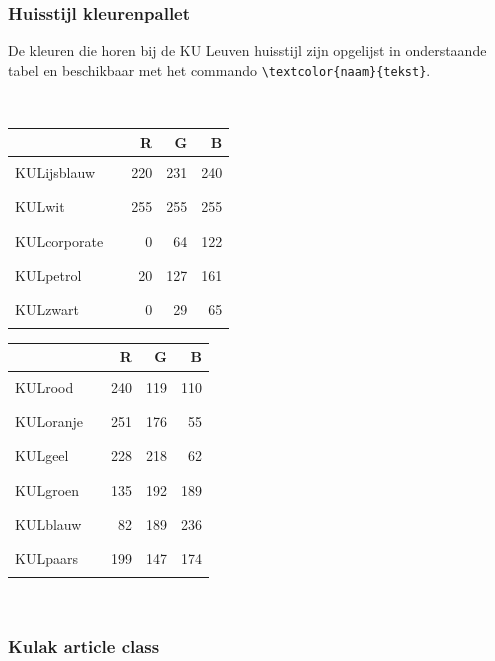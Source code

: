 \documentclass[kulak]{kulakarticle} %
\begin{document}
\subsubsection{Huisstijl kleurenpallet}

De kleuren die horen bij de KU Leuven huisstijl zijn opgelijst in onderstaande tabel en beschikbaar met het commando \verb+\textcolor{naam}{tekst}+.

~\hfill\begin{tabular}{ll|r|r|r}
	                            & &   R &   G &   B \\\hline
	KULijsblauw &\textcolor{KULijsblauw} {\rule{1ex}{1ex}}   & 220 & 231 & 240 \\
	KULwit      &\textcolor{KULwit}    {\rule{1ex}{1ex}}           & 255 & 255 & 255 \\
	KULcorporate&\textcolor{KULcorporate}{\rule{1ex}{1ex}} &   0 &  64 & 122 \\
	KULpetrol   &\textcolor{KULpetrol}   {\rule{1ex}{1ex}}       &  20 & 127 & 161 \\
	KULzwart  & \textcolor{KULzwart} {\rule{1ex}{1ex}} &   0 &  29 & 65  
\end{tabular} \hfill
\begin{tabular}{ll|r|r|r}
	          &                                       &   R &   G & B   \\ \hline

	KULrood   & \textcolor{KULrood}  {\rule{1ex}{1ex}} & 240 & 119 & 110 \\
	KULoranje & \textcolor{KULoranje}{\rule{1ex}{1ex}} & 251 & 176 & 55  \\
	KULgeel   & \textcolor{KULgeel}  {\rule{1ex}{1ex}} & 228 & 218 & 62  \\
	KULgroen  & \textcolor{KULgroen} {\rule{1ex}{1ex}} & 135 & 192 & 189 \\
	KULblauw  & \textcolor{KULblauw} {\rule{1ex}{1ex}} &  82 & 189 & 236 \\
	KULpaars  & \textcolor{KULpaars} {\rule{1ex}{1ex}} & 199 & 147 & 174
\end{tabular}\hfill~

\subsubsection{Kulak article class}
\end{document}
